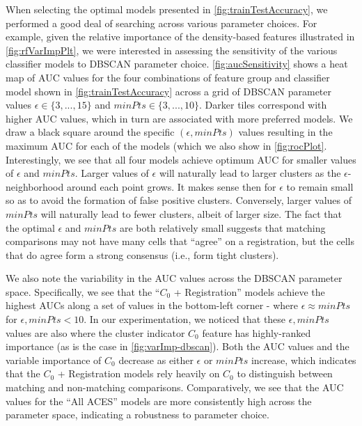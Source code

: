 \documentclass[11pt,]{isuthesis}
\begin{document}
When selecting the optimal models presented in \ref{fig:trainTestAccuracy}, we performed a good deal of searching across various parameter choices.
For example, given the relative importance of the density-based features illustrated in \ref{fig:rfVarImpPlt}, we were interested in assessing the sensitivity of the various classifier models to DBSCAN parameter choice.
\ref{fig:aucSensitivity} shows a heat map of AUC values for the four combinations of feature group and classifier model shown in \ref{fig:trainTestAccuracy} across a grid of DBSCAN parameter values \(\epsilon \in \{3,...,15\}\) and \(minPts \in \{3,...,10\}\).
Darker tiles correspond with higher AUC values, which in turn are associated with more preferred models.
We draw a black square around the specific \((\epsilon, minPts)\) values resulting in the maximum AUC for each of the models (which we also show in \ref{fig:rocPlot}.
Interestingly, we see that all four models achieve optimum AUC for smaller values of \(\epsilon\) and \(minPts\).
Larger values of \(\epsilon\) will naturally lead to larger clusters as the \(\epsilon\)-neighborhood around each point grows.
It makes sense then for \(\epsilon\) to remain small so as to avoid the formation of false positive clusters.
Conversely, larger values of \(minPts\) will naturally lead to fewer clusters, albeit of larger size.
The fact that the optimal \(\epsilon\) and \(minPts\) are both relatively small suggests that matching comparisons may not have many cells that ``agree'' on a registration, but the cells that do agree form a strong consensus (i.e., form tight clusters).

We also note the variability in the AUC values across the DBSCAN parameter space.
Specifically, we see that the ``\(C_0\) + Registration'' models achieve the highest AUCs along a set of values in the bottom-left corner - where \(\epsilon \approx minPts\) for \(\epsilon,minPts < 10\).
In our experimentation, we noticed that these \(\epsilon, minPts\) values are also where the cluster indicator \(C_0\) feature has highly-ranked importance (as is the case in \autoref{fig:varImp-dbscan}).
Both the AUC values and the variable importance of \(C_0\) decrease as either \(\epsilon\) or \(minPts\) increase, which indicates that the \(C_0\) + Registration models rely heavily on \(C_0\) to distinguish between matching and non-matching comparisons.
Comparatively, we see that the AUC values for the ``All ACES'' models are more consistently high across the parameter space, indicating a robustness to parameter choice.
\end{document}
